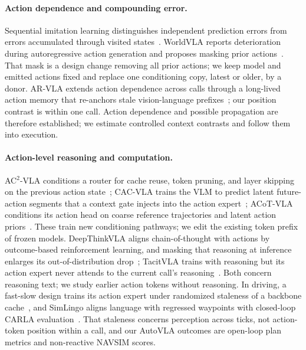 
\paragraph{Action dependence and compounding error.}
Sequential imitation learning distinguishes independent prediction errors from errors accumulated through visited states~\cite{ross2011dagger}. WorldVLA reports deterioration during autoregressive action generation and proposes masking prior actions~\cite{cen2025worldvla}.
That mask is a design change removing all prior actions; we keep model and emitted actions fixed and replace one conditioning copy, latest or older, by a donor. AR-VLA extends action dependence across calls through a long-lived action memory that re-anchors stale vision-language prefixes~\cite{hu2026arvla}; our position contrast is within one call.
Action dependence and possible propagation are therefore established; we estimate controlled context contrasts and follow them into execution.

\paragraph{Action-level reasoning and computation.}
AC$^2$-VLA conditions a router for cache reuse, token pruning, and layer skipping on the previous action state~\cite{yu2026ac2vla}; CAC-VLA trains the VLM to predict latent future-action segments that a context gate injects into the action expert~\cite{xiong2026cacvla}; ACoT-VLA conditions its action head on coarse reference trajectories and latent action priors~\cite{zhong2026acotvla}. These train new conditioning pathways; we edit the existing token prefix of frozen models. DeepThinkVLA aligns chain-of-thought with actions by outcome-based reinforcement learning, and masking that reasoning at inference enlarges its out-of-distribution drop~\cite{yin2025deepthinkvla}; TacitVLA trains with reasoning but its action expert never attends to the current call's reasoning~\cite{lu2026tacitvla}. Both concern reasoning text; we study earlier action tokens without reasoning. In driving, a fast-slow design trains its action expert under randomized staleness of a backbone cache~\cite{li2026thinkact5hz}, and SimLingo aligns language with regressed waypoints with closed-loop CARLA evaluation~\cite{renz2025simlingo}. That staleness concerns perception across ticks, not action-token position within a call, and our AutoVLA outcomes are open-loop plan metrics and non-reactive NAVSIM scores.
